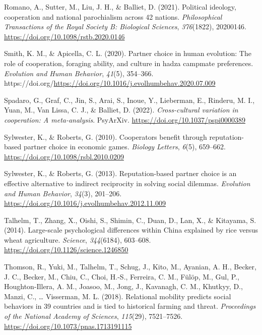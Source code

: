 \documentclass[
  man,floatsintext]{apa6}
\newlength{\cslhangindent}
\newlength{\cslentryspacingunit} %
\newenvironment{CSLReferences}[2] %
 {%
  \setlength{\parindent}{0pt}
  \ifodd #1
  \let\oldpar\par
  \def\par{\hangindent=\cslhangindent\oldpar}
  \fi
  \setlength{\parskip}{#2\cslentryspacingunit}
 }%
 {}
\begin{document}
\begin{CSLReferences}{1}{0}
\leavevmode{}%
Romano, A., Sutter, M., Liu, J. H., \& Balliet, D. (2021). Political ideology, cooperation and national parochialism across 42 nations. \emph{Philosophical Transactions of the Royal Society B: Biological Sciences}, \emph{376}(1822), 20200146. \url{https://doi.org/10.1098/rstb.2020.0146}

\leavevmode{}%
Smith, K. M., \& Apicella, C. L. (2020). Partner choice in human evolution: The role of cooperation, foraging ability, and culture in hadza campmate preferences. \emph{Evolution and Human Behavior}, \emph{41}(5), 354--366. https://doi.org/\url{https://doi.org/10.1016/j.evolhumbehav.2020.07.009}

\leavevmode{}%
Spadaro, G., Graf, C., Jin, S., Arai, S., Inoue, Y., Lieberman, E., Rinderu, M. I., Yuan, M., Van Lissa, C. J., \& Balliet, D. (2022). \emph{Cross-cultural variation in cooperation: A meta-analysis}. PsyArXiv. \url{https://doi.org/10.1037/pspi0000389}

\leavevmode{}%
Sylwester, K., \& Roberts, G. (2010). Cooperators benefit through reputation-based partner choice in economic games. \emph{Biology Letters}, \emph{6}(5), 659--662. \url{https://doi.org/10.1098/rsbl.2010.0209}

\leavevmode{}%
Sylwester, K., \& Roberts, G. (2013). Reputation-based partner choice is an effective alternative to indirect reciprocity in solving social dilemmas. \emph{Evolution and Human Behavior}, \emph{34}(3), 201--206. \url{https://doi.org/10.1016/j.evolhumbehav.2012.11.009}

\leavevmode{}%
Talhelm, T., Zhang, X., Oishi, S., Shimin, C., Duan, D., Lan, X., \& Kitayama, S. (2014). Large-scale psychological differences within {C}hina explained by rice versus wheat agriculture. \emph{Science}, \emph{344}(6184), 603--608. \url{https://doi.org/10.1126/science.1246850}

\leavevmode{}%
Thomson, R., Yuki, M., Talhelm, T., Schug, J., Kito, M., Ayanian, A. H., Becker, J. C., Becker, M., Chiu, C., Choi, H.-S., Ferreira, C. M., Fülöp, M., Gul, P., Houghton-Illera, A. M., Joasoo, M., Jong, J., Kavanagh, C. M., Khutkyy, D., Manzi, C., \ldots{} Visserman, M. L. (2018). Relational mobility predicts social behaviors in 39 countries and is tied to historical farming and threat. \emph{Proceedings of the National Academy of Sciences}, \emph{115}(29), 7521--7526. \url{https://doi.org/10.1073/pnas.1713191115}


\end{CSLReferences}
\end{document}
